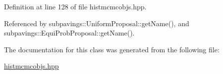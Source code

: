 \-Definition at line 128 of file histmcmcobjs.\-hpp.



\-Referenced by subpavings\-::\-Uniform\-Proposal\-::get\-Name(), and subpavings\-::\-Equi\-Prob\-Proposal\-::get\-Name().



\-The documentation for this class was generated from the following file\-:\begin{DoxyCompactItemize}
\item 
\hyperlink{histmcmcobjs_8hpp}{histmcmcobjs.\-hpp}\end{DoxyCompactItemize}
